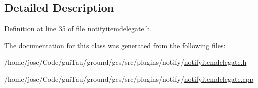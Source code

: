 \subsection{Detailed Description}


Definition at line 35 of file notifyitemdelegate.\-h.



The documentation for this class was generated from the following files\-:\begin{DoxyCompactItemize}
\item 
/home/jose/\-Code/gui\-Tau/ground/gcs/src/plugins/notify/\hyperlink{notifyitemdelegate_8h}{notifyitemdelegate.\-h}\item 
/home/jose/\-Code/gui\-Tau/ground/gcs/src/plugins/notify/\hyperlink{notifyitemdelegate_8cpp}{notifyitemdelegate.\-cpp}\end{DoxyCompactItemize}
